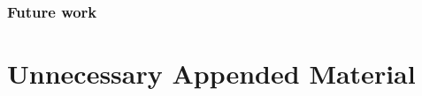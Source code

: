 \documentclass{kththesis}
\begin{document}
\subsection{Future work}



\printbibliography[heading=bibintoc] 

\appendix

\chapter{Unnecessary Appended Material}
\end{document}
